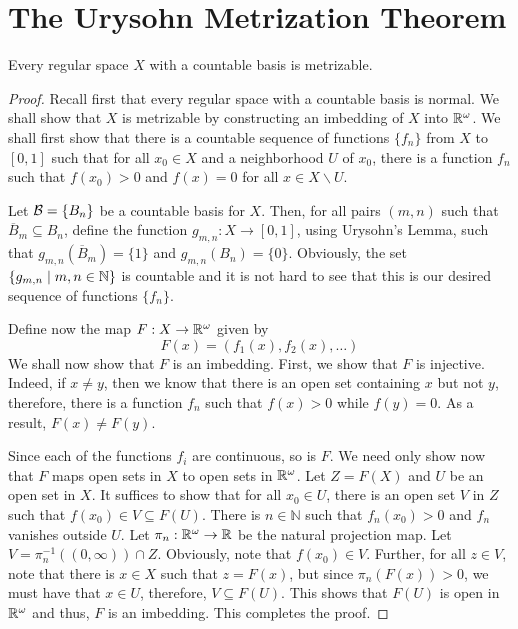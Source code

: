 \begin{theorem}
    
\end{theorem}

\section{The Urysohn Metrization Theorem}
\begin{theorem}
    Every regular space $X$ with a countable basis is metrizable.
\end{theorem}
\begin{proof}
    Recall first that every regular space with a countable basis is normal.
    We shall show that $X$ is metrizable by constructing an imbedding of $X$ into $\mathbb{R}^\omega$. We shall first show that there is a countable sequence of functions $\{f_n\}$ from $X$ to $[0,1]$ such that for all $x_0\in X$ and a neighborhood $U$ of $x_0$, there is a function $f_n$ such that $f(x_0) > 0$ and $f(x)=0$ for all $x\in X\backslash U$.

    Let $\mathcal{B} = \{B_n\}$ be a countable basis for $X$. Then, for all pairs $(m, n)$ such that $\overline{B}_m\subseteq B_n$, define the function $g_{m,n}:X\to[0,1]$, using Urysohn's Lemma, such that $g_{m,n}(\overline{B}_m) = \{1\}$ and $g_{m,n}(B_n) = \{0\}$. Obviously, the set $\{g_{m,n}\mid m,n\in\mathbb{N}\}$ is countable and it is not hard to see that this is our desired sequence of functions $\{f_n\}$.

    Define now the map $F:X\to\mathbb{R}^\omega$ given by
    \begin{equation*}
        F(x) = (f_1(x),f_2(x),\ldots)
    \end{equation*}
    We shall now show that $F$ is an imbedding. First, we show that $F$ is injective. Indeed, if $x\ne y$, then we know that there is an open set containing $x$ but not $y$, therefore, there is a function $f_n$ such that $f(x) > 0$ while $f(y) = 0$. As a result, $F(x)\ne F(y)$.

    Since each of the functions $f_i$ are continuous, so is $F$. We need only show now that $F$ maps open sets in $X$ to open sets in $\mathbb{R}^\omega$. Let $Z = F(X)$ and $U$ be an open set in $X$. It suffices to show that for all $x_0\in U$, there is an open set $V$ in $Z$ such that $f(x_0)\in V\subseteq F(U)$. There is $n\in\mathbb{N}$ such that $f_n(x_0) > 0$ and $f_n$ vanishes outside $U$. Let $\pi_n: \mathbb{R}^\omega\to\mathbb{R}$ be the natural projection map. Let $V = \pi_n^{-1}((0,\infty))\cap Z$. Obviously, note that $f(x_0)\in V$. Further, for all $z\in V$, note that there is $x\in X$ such that $z = F(x)$, but since $\pi_n(F(x)) > 0$, we must have that $x\in U$, therefore, $V\subseteq F(U)$. This shows that $F(U)$ is open in $\mathbb{R}^\omega$ and thus, $F$ is an imbedding. This completes the proof.
\end{proof}

